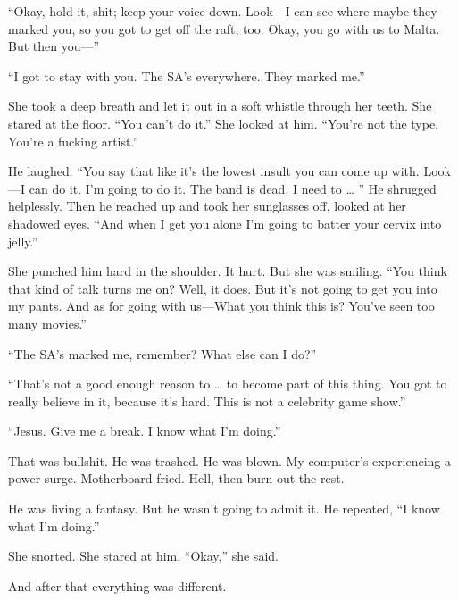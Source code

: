 “Okay, hold it, shit; keep your voice down. Look—I can see where maybe they marked you, so you got to get off the raft, too. Okay, you go with us to Malta. But then you—”

“I got to stay with you. The SA’s everywhere. They marked me.”

She took a deep breath and let it out in a soft whistle through her teeth. She stared at the floor. “You can’t do it.” She looked at him. “You’re not the type. You’re a fucking artist.”

He laughed. “You say that like it’s the lowest insult you can come up with. Look—I can do it. I’m going to do it. The band is dead. I need to … ” He shrugged helplessly. Then he reached up and took her sunglasses off, looked at her shadowed eyes. “And when I get you alone I’m going to batter your cervix into jelly.”

She punched him hard in the shoulder. It hurt. But she was smiling. “You think that kind of talk turns me on? Well, it does. But it’s not going to get you into my pants. And as for going with us—What you think this is? You’ve seen too many movies.”

“The SA’s marked me, remember? What else can I do?”

“That’s not a good enough reason to … to become part of this thing. You got to really believe in it, because it’s hard. This is not a celebrity game show.”

“Jesus. Give me a break. I know what I’m doing.”

That was bullshit. He was trashed. He was blown. My computer’s experiencing a power surge. Motherboard fried. Hell, then burn out the rest.

He was living a fantasy. But he wasn’t going to admit it. He repeated, “I know what I’m doing.”

She snorted. She stared at him. “Okay,” she said.

And after that everything was different.